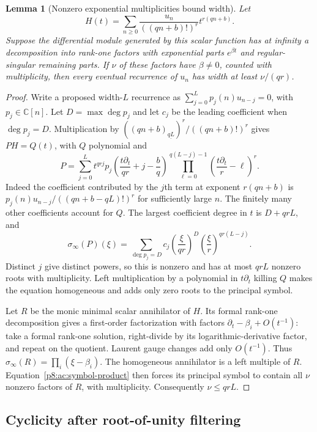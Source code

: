 \documentclass[11pt,a4paper]{article}
\newtheorem{lemma}[theorem]{Lemma}
\theoremstyle{definition}
\theoremstyle{remark}
\numberwithin{equation}{section}
\begin{document}
\begin{lemma}[Nonzero exponential multiplicities bound width]
\label{p8:ac:budget}
Let
\[
 H(t)=\sum_{n\ge0}\frac{u_n}{((qn+b)!)^r}t^{r(qn+b)}.
\]
Suppose the differential module generated by this scalar function has
at infinity a decomposition into rank-one factors with exponential
parts $e^{\beta t}$ and regular-singular remaining parts. If $\nu$
of these factors have $\beta\ne0$, counted with multiplicity, then
every eventual recurrence of $u_n$ has width at least $\nu/(qr)$.
\end{lemma}
\begin{proof}
Write a proposed width-$L$ recurrence as
$\sum_{j=0}^L p_j(n)u_{n-j}=0$, with $p_j\in\mathbb C[n]$.
Let $D=\max\deg p_j$ and let $c_j$ be the leading coefficient when
$\deg p_j=D$. Multiplication by
$((qn+b)_{\underline{qL}})^r/((qn+b)!)^r$ gives
$PH=Q(t)$, with $Q$ polynomial and
\[
 P=\sum_{j=0}^L t^{qrj}
 p_j\left(\frac{t\partial_t}{qr}+j-\frac bq\right)
 \prod_{\ell=0}^{q(L-j)-1}
       \left(\frac{t\partial_t}{r}-\ell\right)^r.
\]
Indeed the coefficient contributed by the $j$th term at exponent
$r(qn+b)$ is $p_j(n)u_{n-j}/((qn+b-qL)!)^r$ for sufficiently
large $n$. The finitely many other coefficients account for $Q$.
The largest coefficient degree in $t$ is $D+qrL$, and
\begin{equation}\label{p8:ac:symbol}
 \sigma_\infty(P)(\xi)
 =\sum_{\deg p_j=D}c_j
       \left(\frac\xi{qr}\right)^D
       \left(\frac\xi r\right)^{qr(L-j)}.
\end{equation}
Distinct $j$ give distinct powers, so this is nonzero and has at most
$qrL$ nonzero roots with multiplicity. Left multiplication by a
polynomial in $t\partial_t$ killing $Q$ makes the equation homogeneous
and adds only zero roots to the principal symbol.

Let $R$ be the monic minimal scalar annihilator of $H$. Its formal
rank-one decomposition gives a first-order factorization with factors
$\partial_t-\beta_i+O(t^{-1})$: take a formal rank-one solution,
right-divide by its logarithmic-derivative factor, and repeat on the
quotient. Laurent gauge changes add only $O(t^{-1})$.
Thus $\sigma_\infty(R)=\prod_i(\xi-\beta_i)$.
The homogeneous annihilator is a left multiple of $R$.
Equation~\eqref{p8:ac:symbol-product} then forces its principal symbol
to contain all $\nu$ nonzero factors of $R$, with multiplicity.
Consequently $\nu\le qrL$.
\end{proof}

\subsection{Cyclicity after root-of-unity filtering}
\end{document}

